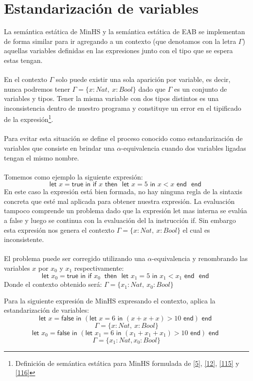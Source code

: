 \section{Estandarización de variables}
La semántica estática de \textsf{MinHS} y la semántica estática de \textsf{EAB} se implementan de forma similar para ir agregando a un contexto (que denotamos con la letra $\Gamma$) aquellas variables definidas en las expresiones junto con el tipo que se espera estas tengan.\\\\
En el contexto $\Gamma$ solo puede existir una sola aparición por variable, es decir, nunca podremos tener $\Gamma=\{x : Nat,\ x : Bool\}$ dado que $\Gamma$ es un conjunto de variables y tipos. Tener la misma variable con dos tipos distintos es una inconsistencia dentro de nuestro programa y constituye un error en el tipificado de la expresión\footnote{Definición de semántica estática para \textsf{MinHS} formulada de  \hyperlink{5}{[5]},  \hyperlink{12}{[12]}, \hyperlink{115}{[115]} y \hyperlink{116}{[116]}}.\\\\
Para evitar esta situación se define el proceso conocido como estandarización de variables que consiste en brindar una $\alpha$-equivalencia cuando dos variables ligadas tengan el mismo nombre.\\\\
Tomemos como ejemplo la siguiente expresión:
$$ \textsf{let } x = \textsf{true} \textsf{ in } \textsf{if } x \textsf{ then } \textsf{ let } x = 5 \textsf{ in } x < x \textsf{ end } \textsf{ end }$$
En este caso la expresión está bien formada, no hay ninguna regla de la sintaxis concreta que esté mal aplicada para obtener nuestra expresión. La evaluación tampoco comprende un problema dado que la expresión \textsf{let} mas interna se evalúa a \textsf{false} y luego se continua con la evaluación del la instrucción \textsf{if}. Sin embargo esta expresión nos genera el contexto $\Gamma=\{x : Nat,\ x : Bool\}$ el cual es inconsistente.\\\\
El problema puede ser corregido utilizando una $\alpha$-equivalencia y renombrando las variables $x$ por $x_0$ y $x_1$ respectivamente:
$$ \textsf{let } x_0 = \textsf{true} \textsf{ in } \textsf{if } x_0\ \textsf{ then } \textsf{ let } x_1 = 5 \textsf{ in } x_1 < x_1 \textsf{ end } \textsf{ end }$$
Donde el contexto obtenido será: $\Gamma=\{x_1 : Nat,\ x_0 : Bool\}$

\begin{exercise}
    Para la siguiente expresión de \textsf{MinHS} expresando el contexto, aplica la estandarización de variables:
    $$\textsf{let } x = \textsf{false} \textsf{ in } (\textsf{let } x = 6 \textsf{ in } (x + x + x) > 10 \textsf{ end}) \textsf{ end }$$
    $$\Gamma=\{x : Nat,\ x : Bool\}$$ 
    $$\textsf{let } x_0 = \textsf{false} \textsf{ in } (\textsf{let } x_1 = 6 \textsf{ in } (x_1 + x_1 + x_1) > 10 \textsf{ end}) \textsf{ end }$$
    $$\Gamma=\{x_1 : Nat, x_0 : Bool\}$$

\end{exercise} 

